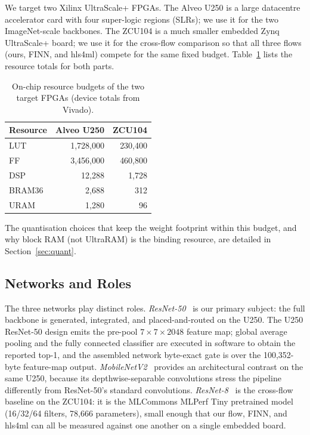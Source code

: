 \documentclass[acmtog,authorversion]{acmart}
\begin{document}
We target two Xilinx UltraScale+ FPGAs. The Alveo U250 is a large datacentre accelerator card with four super-logic regions (SLRs); we use it for the two ImageNet-scale backbones. The ZCU104 is a much smaller embedded Zynq UltraScale+ board; we use it for the cross-flow comparison so that all three flows (ours, FINN, and hls4ml) compete for the same fixed budget. Table~\ref{tab:devices} lists the resource totals for both parts.

\begin{table}[t]
\centering
\caption{On-chip resource budgets of the two target FPGAs (device totals from Vivado).}
\label{tab:devices}
\begin{tabular}{lrr}
\toprule
Resource & Alveo U250 & ZCU104 \\
\midrule
LUT     & 1,728,000 & 230,400 \\
FF      & 3,456,000 & 460,800 \\
DSP     & 12,288    & 1,728   \\
BRAM36  & 2,688     & 312     \\
URAM    & 1,280     & 96      \\
\bottomrule
\end{tabular}
\end{table}

The quantisation choices that keep the weight footprint within this budget, and why block RAM (not UltraRAM) is the binding resource, are detailed in Section~\ref{sec:quant}.

\subsection{Networks and Roles}

The three networks play distinct roles. \emph{ResNet-50}~\cite{he2016} is our primary subject: the full backbone is generated, integrated, and placed-and-routed on the U250. The U250 ResNet-50 design emits the pre-pool $7\times7\times2048$ feature map; global average pooling and the fully connected classifier are executed in software to obtain the reported top-1, and the assembled network byte-exact gate is over the 100,352-byte feature-map output. \emph{MobileNetV2}~\cite{sandler2018} provides an architectural contrast on the same U250, because its depthwise-separable convolutions stress the pipeline differently from ResNet-50's standard convolutions. \emph{ResNet-8}~\cite{banbury2021} is the cross-flow baseline on the ZCU104: it is the MLCommons MLPerf Tiny pretrained model (16/32/64 filters, 78,666 parameters), small enough that our flow, FINN, and hls4ml can all be measured against one another on a single embedded board.
\end{document}
